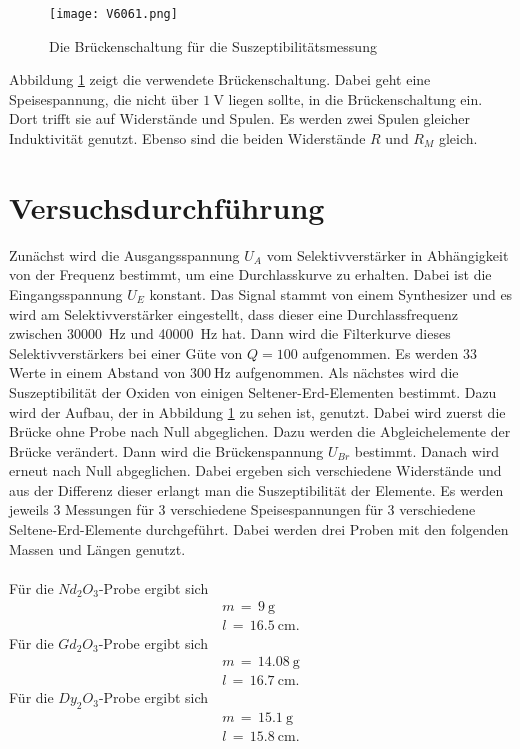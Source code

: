\documentclass[
  bibliography=totoc,     %
  captions=tableheading,  %
  titlepage=firstiscover, %
]{scrartcl}
\begin{document}
\begin{figure}[H]
  \centering
  \texttt{[image: V6061.png]}
  \caption{Die Brückenschaltung für die Suszeptibilitätsmessung \cite{anleitung}}
  \label{fig:V6063}
\end{figure}
\noindent
Abbildung \ref{fig:V6063} zeigt die verwendete Brückenschaltung. Dabei geht
eine Speisespannung, die nicht über $\SI{1}{\volt}$ liegen sollte, in die
Brückenschaltung ein. Dort trifft sie auf Widerstände und Spulen. Es werden
zwei Spulen gleicher Induktivität genutzt. Ebenso sind die beiden Widerstände
$R$ und $R_M$ gleich.
\section{Versuchsdurchführung}
\label{sec:durchführung}
Zunächst wird die Ausgangsspannung $U_A$ vom Selektivverstärker in Abhängigkeit
von der Frequenz bestimmt, um eine Durchlasskurve zu erhalten. Dabei ist die
Eingangsspannung $U_E$ konstant. Das Signal stammt von einem Synthesizer und
es wird am Selektivverstärker eingestellt, dass dieser eine Durchlassfrequenz
zwischen \SI{30000}{\hertz} und \SI{40000}{\hertz} hat. Dann wird die
Filterkurve dieses Selektivverstärkers bei einer Güte von $Q=100$ aufgenommen.
Es werden 33 Werte in einem Abstand von $\SI{300}{\hertz}$ aufgenommen.
Als nächstes wird die Suszeptibilität der Oxiden von einigen
Seltener-Erd-Elementen bestimmt. Dazu wird der Aufbau, der in Abbildung
\ref{fig:V6063} zu sehen ist, genutzt. Dabei wird zuerst die Brücke ohne
Probe nach Null abgeglichen. Dazu werden die Abgleichelemente der Brücke
verändert. Dann wird die Brückenspannung $U_{Br}$ bestimmt. Danach wird
erneut nach Null abgeglichen. Dabei ergeben sich verschiedene Widerstände
und aus der Differenz dieser erlangt man die Suszeptibilität der Elemente.
Es werden jeweils 3 Messungen für 3 verschiedene Speisespannungen für 3
verschiedene Seltene-Erd-Elemente durchgeführt.
\noindent
Dabei werden drei Proben mit den folgenden Massen und Längen genutzt. \\
\\
Für die $Nd_2O_3$-Probe ergibt sich
\begin{align*}
  m\,=\,\SI{9}{\gram} \\
  l\,=\,\SI{16.5}{\centi\meter}.
\end{align*}
Für die $Gd_2O_3$-Probe ergibt sich
\begin{align*}
  m\,=\,\SI{14.08}{\gram} \\
  l\,=\,\SI{16.7}{\centi\meter}.
\end{align*}
Für die $Dy_2O_3$-Probe ergibt sich
\begin{align*}
  m\,=\,\SI{15.1}{\gram} \\
  l\,=\,\SI{15.8}{\centi\meter}.
\end{align*}
\end{document}
